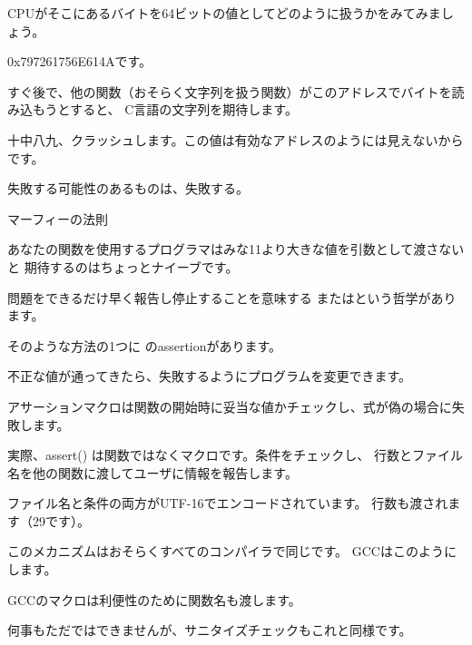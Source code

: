 CPUがそこにあるバイトを64ビットの値としてどのように扱うかをみてみましょう。



0x797261756E614Aです。

すぐ後で、他の関数（おそらく文字列を扱う関数）がこのアドレスでバイトを読み込もうとすると、
C言語の文字列を期待します。

十中八九、クラッシュします。この値は有効なアドレスのようには見えないからです。


\epigraph{失敗する可能性のあるものは、失敗する。}{マーフィーの法則}

あなたの関数を使用するプログラマはみな11より大きな値を引数として渡さないと
期待するのはちょっとナイーブです。

問題をできるだけ早く報告し停止することを意味する
またはという哲学があります。


そのような方法の1つに \CCpp のassertionがあります。

不正な値が通ってきたら、失敗するようにプログラムを変更できます。



アサーションマクロは関数の開始時に妥当な値かチェックし、式が偽の場合に失敗します。



実際、assert() は関数ではなくマクロです。条件をチェックし、
行数とファイル名を他の関数に渡してユーザに情報を報告します。

ファイル名と条件の両方がUTF-16でエンコードされています。
行数も渡されます（29です）。

このメカニズムはおそらくすべてのコンパイラで同じです。
GCCはこのようにします。



GCCのマクロは利便性のために関数名も渡します。

何事もただではできませんが、サニタイズチェックもこれと同様です。

